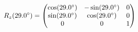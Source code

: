 \documentclass[preview]{standalone}
\begin{document}
\begin{align*}
\special{dvisvgm:raw <g id='unique000'>}R_z(29.0^\circ) = \begin{pmatrix} \cos(29.0^\circ) & -\sin(29.0^\circ) & 0 \\ \sin(29.0^\circ) & \cos(29.0^\circ) & 0 \\ 0 & 0 & 1 \end{pmatrix}\special{dvisvgm:raw </g>}
\end{align*}
\end{document}
